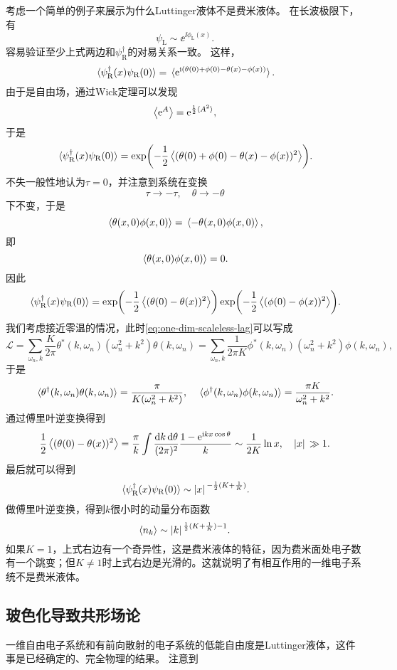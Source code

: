 考虑一个简单的例子来展示为什么Luttinger液体不是费米液体。
在长波极限下，有
\begin{equation}
    {\psi}_\text{L} \sim \ee^{\ii \phi_\text{L}(x)}.
\end{equation}
容易验证至少上式两边和${\psi}^\dagger_\text{R}$的对易关系一致。
这样，
\[
    \expval*{{\psi}_\text{R}^\dagger(x) {\psi}_\text{R}(0)} = \expval*{\mathrm{e}^{\mathrm{i} ({\theta}(0) + {\phi}(0) - {\theta}(x) - {\phi}(x))}}.
\]
由于是自由场，通过Wick定理可以发现
\[
    \expval{\mathrm{e}^{{A}}} = \mathrm{e}^{\frac{1}{2} \expval*{{A}^2}},
\]
于是
\[
    \expval*{{\psi}_\text{R}^\dagger(x) {\psi}_\text{R}(0)} = \exp(- \frac{1}{2} \expval{({\theta}(0) + {\phi}(0) - {\theta}(x) - {\phi}(x))^2}).
\]
不失一般性地认为$\tau=0$，并注意到系统在变换
\[
    \tau \longrightarrow - \tau, \quad \theta \longrightarrow -\theta
\]
下不变，于是
\[
    \expval*{{\theta}(x, 0) {\phi}(x, 0)} = \expval*{- {\theta}(x, 0) {\phi}(x, 0)},
\]
即
\[
    \expval*{{\theta}(x, 0) {\phi}(x, 0)} = 0.
\]
因此
\[
    \expval*{{\psi}_\text{R}^\dagger(x) {\psi}_\text{R}(0)} = \exp(- \frac{1}{2} \expval{({\theta}(0) - {\theta}(x))^2}) \exp(- \frac{1}{2} \expval{({\phi}(0) - {\phi}(x))^2}).
\]
我们考虑接近零温的情况，此时\eqref{eq:one-dim-scaleless-lag}可以写成
\[
    \mathcal{L} = \sum_{\omega_n, k} \frac{K}{2\pi} \theta^*(k, \omega_n) (\omega_n^2 + k^2) \theta(k, \omega_n) = \sum_{\omega_n, k} \frac{1}{2\pi K} \phi^*(k, \omega_n) (\omega_n^2 + k^2) \phi(k, \omega_n),
\]
于是
\[
    \expval*{{\theta}^\dagger(k, \omega_n) {\theta}(k, \omega_n)} = \frac{\pi}{K (\omega_n^2 + k^2)}, \quad \expval*{{\phi}^\dagger(k, \omega_n) {\phi}(k, \omega_n)} = \frac{\pi K}{\omega_n^2 + k^2}.
\]
通过傅里叶逆变换得到
\[
    \frac{1}{2} \expval{({\theta}(0) - {\theta}(x))^2} = \frac{\pi}{k} \int \frac{\dd{k} \dd{\theta}}{(2\pi)^2} \frac{1 - \mathrm{e}^{\mathrm{i} k x \cos \theta}}{k} \sim \frac{1}{2K} \ln x, \quad \abs*{x} \gg 1.
\]
最后就可以得到
\[
    \expval*{{\psi}_\text{R}^\dagger(x) {\psi}_\text{R}(0)} \sim \abs*{x}^{-\frac{1}{2}(K + \frac{1}{K})}.
\]
做傅里叶逆变换，得到$k$很小时的动量分布函数
\[
    \expval{{n}_k} \sim \abs*{k}^{\frac{1}{2}(K + \frac{1}{K}) - 1}.
\]
如果$K=1$，上式右边有一个奇异性，这是费米液体的特征，因为费米面处电子数有一个跳变；但$K \neq 1$时上式右边是光滑的。这就说明了有相互作用的一维电子系统不是费米液体。

\subsection{玻色化导致共形场论}

一维自由电子系统和有前向散射的电子系统的低能自由度是Luttinger液体，这件事是已经确定的、完全物理的结果。
注意到


